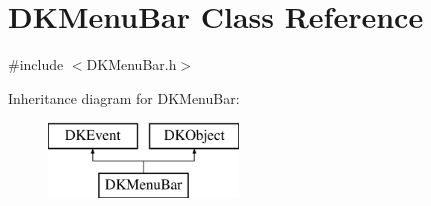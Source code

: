 \hypertarget{class_d_k_menu_bar}{\section{D\-K\-Menu\-Bar Class Reference}
\label{class_d_k_menu_bar}
}


{\ttfamily \#include $<$D\-K\-Menu\-Bar.\-h$>$}

Inheritance diagram for D\-K\-Menu\-Bar\-:\begin{figure}[H]
\begin{center}
\leavevmode
\includegraphics[height=2.000000cm]{class_d_k_menu_bar}
\end{center}
\end{figure}
